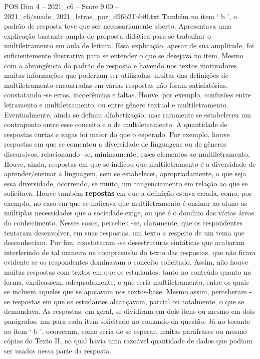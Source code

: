 \begin{textsample}{POS Dim 4 – 2021\_c6 – Score 9.00 – 2021\_c6/enade\_2021\_letras\_por\_d96b21bbf0.txt}
Também no item ‘ b ’, o padrão de resposta teve que ser necessariamente aberto.
Apresentava uma explicação bastante ampla de proposta didática para se trabalhar o multiletramento em aula de leitura.
Essa explicação, apesar de sua amplitude, foi suficientemente ilustrativa para se entender o que se desejava no item.
Mesmo com a abrangência do padrão de resposta e havendo nos textos motivadores muitas informações que poderiam ser utilizadas, muitas das definições de multiletramento encontradas em várias respostas não foram satisfatórias, constatando -se erros, incoerências e faltas.
Houve, por exemplo, confusões entre letramento e multiletramento, ou entre gênero textual e multiletramento.
Eventualmente, ainda se definiu alfabetização, mas raramente se estabeleceu um contraponto entre esse conceito e o de multiletramento.
A quantidade de respostas curtas e vagas foi maior do que o esperado.
Por exemplo, houve respostas em que se comentou a diversidade de linguagens ou de gêneros discursivos, relacionando -se, minimamente, esses elementos ao multiletramento.
Houve, ainda, respostas em que se indicou que multiletramento é a diversidade de aprender/ensinar a linguagem, sem se estabelecer, apropriadamente, o que seja essa diversidade, ocorrendo, se muito, um tangenciamento em relação ao que se solicitava.
Houve também \textbf{repostas} em que a definição estava errada, como, por exemplo, no caso em que se indicava que multiletramento é ensinar ao aluno as múltiplas necessidades que a sociedade exige, ou que é o domínio das várias áreas do conhecimento.
Nesses casos, percebeu -se, claramente, que os respondentes tentaram desenvolver, em suas respostas, um texto a respeito de um tema que desconheciam.
Por fim, constataram -se desestruturas sintáticas que acabaram interferindo de tal maneira na compreensão do texto das respostas, que não ficava evidente se os respondentes dominavam o conceito solicitado.
Assim, não houve muitas respostas com textos em que os estudantes, tanto no conteúdo quanto na forma, explicassem, adequadamente, o que seria multiletramento, entre os quais se incluem aqueles que se apoiavam nos textos-base.
Mesmo assim, perceberam -se respostas em que os estudantes alcançavam, parcial ou totalmente, o que se demandava.
As respostas, em geral, se dividiram em dois itens ou mesmo em dois parágrafos, um para cada item solicitado no comando da questão.
Já no tocante ao item ‘ b ’, ocorreram, como seria de se esperar, muitas paráfrases ou mesmo cópias do Texto II, no qual havia uma razoável quantidade de dados que podiam ser usados nessa parte da resposta.

\end{textsample}
